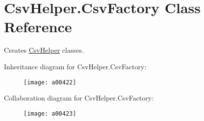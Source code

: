 \hypertarget{a00065}{\section{Csv\-Helper.\-Csv\-Factory Class Reference}
\label{a00065}
}


Creates \hyperlink{a00337}{Csv\-Helper} classes.  




Inheritance diagram for Csv\-Helper.\-Csv\-Factory\-:
\nopagebreak
\begin{figure}[H]
\begin{center}
\leavevmode
\texttt{[image: a00422]}
\end{center}
\end{figure}


Collaboration diagram for Csv\-Helper.\-Csv\-Factory\-:
\nopagebreak
\begin{figure}[H]
\begin{center}
\leavevmode
\texttt{[image: a00423]}
\end{center}
\end{figure}
